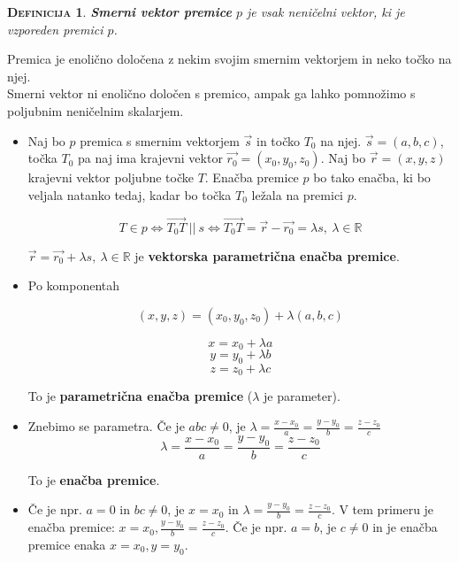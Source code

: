 \documentclass[a4paper,12pt]{article}
\newtheorem*{definicija}{\textsc{Definicija}}
\begin{document}
\begin{definicija}
\textbf{Smerni vektor premice} $p$ je vsak neničelni vektor, ki je vzporeden premici $p$. \\
\end{definicija}

Premica je enolično določena z nekim svojim smernim vektorjem in neko točko na njej. \\

Smerni vektor ni enolično določen s premico, ampak ga lahko pomnožimo s poljubnim neničelnim skalarjem. \\

\begin{itemize}
\item Naj bo $p$ premica s smernim vektorjem $\vec{s}$ in točko $T_0$ na njej. $\vec{s}=(a,b,c)$, točka $T_0$ pa naj ima krajevni vektor $\vec{r_0} =(x_0,y_0,z_0)$. Naj bo $\vec{r}=(x,y,z)$ krajevni vektor poljubne točke $T$. Enačba premice $p$ bo tako enačba, ki bo veljala natanko tedaj, kadar bo točka $T_0$ ležala na premici $p$.

$$ T \in p \Leftrightarrow \overrightarrow{T_0 T} ~ || ~ s \Leftrightarrow \overrightarrow{T_0 T} = \vec{r} - \vec{r_0} = \lambda s, ~ \lambda \in \mathbb{R} $$

$ \vec{r} = \vec{r_0} + \lambda s, ~ \lambda \in \mathbb{R} $ je \textbf{vektorska parametrična enačba premice}.\\

\item Po komponentah

$$ (x,y,z)=(x_0,y_0,z_0)+\lambda(a,b,c) $$

$$ x=x_0 + \lambda a $$
$$ y=y_0 + \lambda b $$
$$ z=z_0 + \lambda c $$

\begin{center}
To je \textbf{parametrična enačba premice} ($\lambda$ je parameter).\\
\end{center}


\item Znebimo se parametra. Če je $abc\neq 0$, je $\lambda=\frac{x-x_0}{a}=\frac{y-y_0}{b}=\frac{z-z_0}{c} $
$$ \lambda = \frac{x-x_0}{a}=\frac{y-y_0}{b}=\frac{z-z_0}{c} $$

\begin{center}
To je \textbf{enačba premice}.
\end{center}

\item Če je npr. $a=0$ in $bc\neq0$, je $x=x_0$ in $\lambda=\frac{y-y_0}{b}=\frac{z-z_0}{c}$. V tem primeru je enačba premice: $x=x_0, \frac{y-y_0}{b}=\frac{z-z_0}{c}$. Če je npr. $a=b$, je $c\neq0$ in je enačba premice enaka $x=x_0,y=y_0$. \\


\end{itemize}
\end{document}
